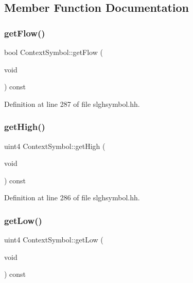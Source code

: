 \subsection{Member Function Documentation}
\mbox{\label{class_context_symbol_adaee13c8da1d8811fc854da9b074ff0f}} 
\subsubsection{\texorpdfstring{getFlow()}{getFlow()}}
{\footnotesize\ttfamily bool Context\+Symbol\+::get\+Flow (\begin{DoxyParamCaption}\item[{void}]{ }\end{DoxyParamCaption}) const\hspace{0.3cm}{\ttfamily [inline]}}



Definition at line 287 of file slghsymbol.\+hh.

\mbox{\label{class_context_symbol_ac8df735881b80f4bab2ab25e59af9cf9}} 
\subsubsection{\texorpdfstring{getHigh()}{getHigh()}}
{\footnotesize\ttfamily uint4 Context\+Symbol\+::get\+High (\begin{DoxyParamCaption}\item[{void}]{ }\end{DoxyParamCaption}) const\hspace{0.3cm}{\ttfamily [inline]}}



Definition at line 286 of file slghsymbol.\+hh.

\mbox{\label{class_context_symbol_a3564b53a8af4f8a3fcc3a601fd783c73}} 
\subsubsection{\texorpdfstring{getLow()}{getLow()}}
{\footnotesize\ttfamily uint4 Context\+Symbol\+::get\+Low (\begin{DoxyParamCaption}\item[{void}]{ }\end{DoxyParamCaption}) const\hspace{0.3cm}{\ttfamily [inline]}}



